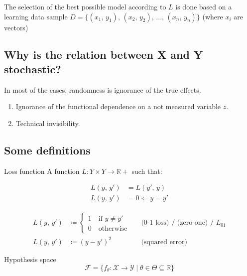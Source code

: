 The selection of the best possible model according to \(L\) is done
based on a learning data sample
\(D = \bigl\{(x_1,\, y_1),\, (x_2,\, y_2),\, ...,\, (x_n,\, y_n)\bigr\}\) (where \(x_i\) are
vectors)

\subsection{Why is the relation between X and Y stochastic?}

In most of the cases, randomness is ignorance of the true effects.
\begin{enumerate}
	\item
	      Ignorance of the functional dependence on a not measured variable
	      \(z\).
	\item
	      Technical invisibility.
\end{enumerate}

\subsection{Some definitions}

\begin{definition}{Loss function}{}
	A function
	\(L: Y \times Y \longrightarrow \mathds{R}+\) such that:

	\begin{align*}
		L(y,\, y') & = L(y',\, y) \tag{symmetry} \\
		L(y,\, y') & = 0  \Longleftarrow y = y'
	\end{align*}

	\begin{align*}
		L(y,\, y') & \coloneqq \begin{cases}1 \quad \text{if } y \neq y' \\ 0 \quad \text{otherwise} \end{cases} &  & \text{(0-1 loss) / (zero-one) / } L_{01} \\
		L(y,\, y') & \coloneqq (y - y')^2                                                                        &  & \text{(squared error)}
	\end{align*}
\end{definition}

\begin{definition}{Hypothesis space}{}
	\begin{equation*}
		\mathcal{F} = \bigl\{f_\theta: \mathcal{X} \rightarrow \mathcal{Y} \mid \theta \in \varTheta \subseteq \mathds{R} \bigr\}
	\end{equation*}
\end{definition}


